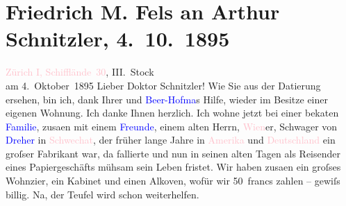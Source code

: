 

               \section[Friedrich M. Fels an Arthur Schnitzler, 4. 10. 1895]{ Friedrich M. Fels an Arthur Schnitzler, 4. 10. 1895}\nopagebreak{}\rehead{ }\normalsize\beginnumbering{} \toendnotes[C]{\smallbreak\pagebreak[2]} 
\toendnotes[C]{\smallbreak}\pstart
           \raggedleft{}{\pb}\textcolor{pink}{Zürich I, Schifflände 30}{}\ledrightnote{\textcolor{pink}{Schifflände}},
                        III. Stock{\\}am 4. Oktober 1895\pend
           \pstart\center{}Lieber Doktor Schnitzler!\pend\pstart
           Wie Sie aus der Datierung ersehen, bin ich, dank Ihrer und \textcolor{blue}{Beer-Hofma{\geminationn}}{}\ledrightnote{\textcolor{blue}{Richard Beer-Hofmann}}s Hilfe, wieder im Besitze einer eigenen Wohnung. Ich danke Ihnen herzlich.
                    Ich wohne jetzt bei einer beka{\geminationn}ten \textcolor{blue}{Familie}{}, zusa{\geminationm}en mit einem \textcolor{blue}{Freunde}{}, einem alten Herrn, \textcolor{pink}{Wien}{}\ledrightnote{\textcolor{pink}{Wien}}er, Schwager von \textcolor{blue}{Dreher}{}\ledrightnote{\textcolor{blue}{Carl Anton Dreher}} in \textcolor{pink}{Schwechat}{}\ledrightnote{\textcolor{pink}{Schwechat}}, der früher
                    lange Jahre in \textcolor{pink}{Amerika}{}\ledrightnote{\textcolor{pink}{Amerika}} und \textcolor{pink}{Deutschland}{}\ledrightnote{\textcolor{pink}{Deutschland}} ein groſser Fabrikant war, da{\geminationn} fallierte und nun in seinen alten Tagen als
                    Reisender eines Papiergeschäfts mühsam sein Leben fristet. Wir haben zusa{\geminationm}en ein groſses Wohnzi{\geminationm}er, ein Kabinet und einen Alkoven, wofür wir 50 francs zahlen – gewiſs billig.
                    Na, der Teufel wird schon weiterhelfen.\pend
